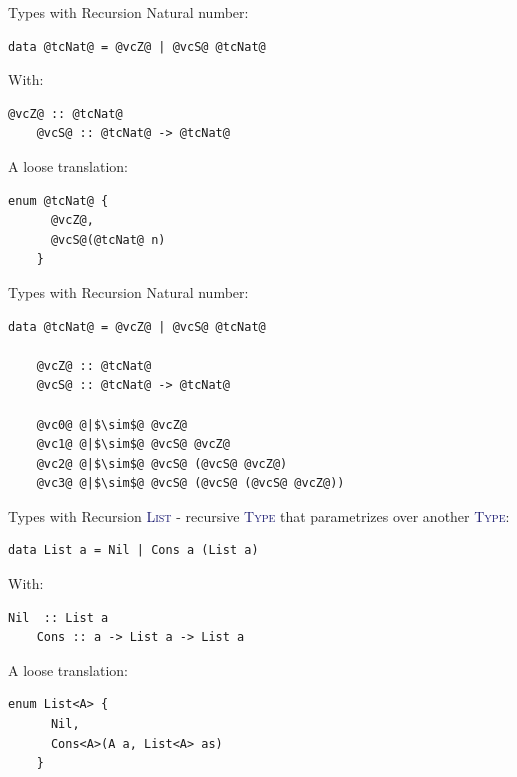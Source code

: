 \documentclass[xcolor={usenames,dvipsnames}]{beamer}
\newcommand{\htycon}[1]{\textcolor{MidnightBlue}{\textsc{#1}}}
\begin{document}
\begin{frame}[fragile]{Types with Recursion}
  Natural number:
  \begin{lstlisting}[style=hask]
    data @tcNat@ = @vcZ@ | @vcS@ @tcNat@
  \end{lstlisting}

  With:
  \begin{lstlisting}[style=hask]
    @vcZ@ :: @tcNat@
    @vcS@ :: @tcNat@ -> @tcNat@
  \end{lstlisting}

  A loose translation:
  \begin{lstlisting}[style=hask]
    enum @tcNat@ {
      @vcZ@,
      @vcS@(@tcNat@ n)
    }
  \end{lstlisting}
\end{frame}

\begin{frame}[fragile]{Types with Recursion}
  Natural number:
  \begin{lstlisting}[style=hask]
    data @tcNat@ = @vcZ@ | @vcS@ @tcNat@

    @vcZ@ :: @tcNat@
    @vcS@ :: @tcNat@ -> @tcNat@

    @vc0@ @|$\sim$@ @vcZ@
    @vc1@ @|$\sim$@ @vcS@ @vcZ@
    @vc2@ @|$\sim$@ @vcS@ (@vcS@ @vcZ@)
    @vc3@ @|$\sim$@ @vcS@ (@vcS@ (@vcS@ @vcZ@))
  \end{lstlisting}
\end{frame}

\begin{frame}[fragile]{Types with Recursion}
  \htycon{List} - recursive \htycon{Type} that parametrizes over another \htycon{Type}:
  \begin{lstlisting}[style=hask]
    data List a = Nil | Cons a (List a)
  \end{lstlisting}

  With:
  \begin{lstlisting}[style=hask]
    Nil  :: List a
    Cons :: a -> List a -> List a
  \end{lstlisting}

  A loose translation:
  \begin{lstlisting}[style=hask]
    enum List<A> {
      Nil,
      Cons<A>(A a, List<A> as)
    }
  \end{lstlisting}
\end{frame}
\end{document}
